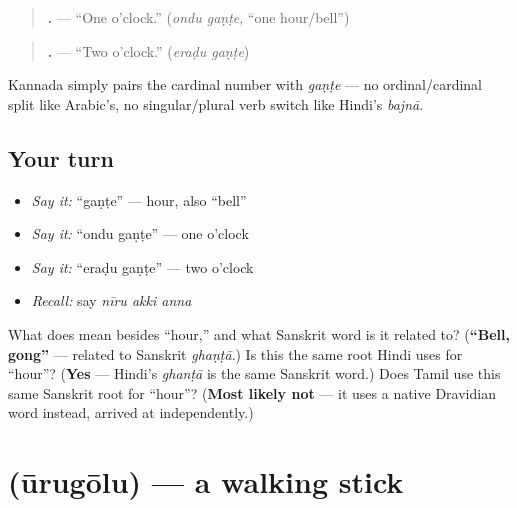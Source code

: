 \begin{grammarlens}[title={Grammar Lens: telling the time}]
\begin{quote}
\textbf{ .} — \textquotedblleft{}One o'clock.\textquotedblright{} (\emph{ondu gaṇṭe}, \textquotedblleft{}one hour/bell\textquotedblright{})
\end{quote}

\begin{quote}
\textbf{ .} — \textquotedblleft{}Two o'clock.\textquotedblright{} (\emph{eraḍu gaṇṭe})
\end{quote}

Kannada simply pairs the cardinal number with \emph{gaṇṭe} — no ordinal/cardinal split like Arabic's, no singular/plural verb switch like Hindi's \emph{bajnā}.
\end{grammarlens}

\subsection*{Your turn}
\begin{itemize}
\raggedright
  \item \emph{Say it:} \textquotedblleft{}gaṇṭe\textquotedblright{} — hour, also \textquotedblleft{}bell\textquotedblright{}
  \item \emph{Say it:} \textquotedblleft{}ondu gaṇṭe\textquotedblright{} — one o'clock
  \item \emph{Say it:} \textquotedblleft{}eraḍu gaṇṭe\textquotedblright{} — two o'clock
  \item \emph{Recall:} say \emph{nīru akki anna}
\end{itemize}

\begin{tcolorbox}[breakable,colback=teal!4,colframe=teal!35!black,title={Before you move on}]
What does \textbf{} mean besides \textquotedblleft{}hour,\textquotedblright{} and what Sanskrit word is it related to? (\textbf{\textquotedblleft{}Bell, gong\textquotedblright{}} — related to Sanskrit \emph{ghaṇṭā}.) Is this the same root Hindi uses for \textquotedblleft{}hour\textquotedblright{}? (\textbf{Yes} — Hindi's \emph{ghanṭā} is the same Sanskrit word.) Does Tamil use this same Sanskrit root for \textquotedblleft{}hour\textquotedblright{}? (\textbf{Most likely not} — it uses a native Dravidian word instead, arrived at independently.)
\end{tcolorbox}
\section[\texorpdfstring{\kn{ಊರುಗೋಲು} (ūrugōlu)}{ಊರುಗೋಲು (ūrugōlu)}]{ (ūrugōlu) — a walking stick}

